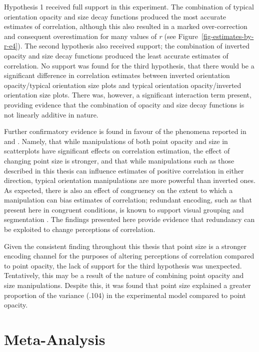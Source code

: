 \documentclass[../main.tex]{subfiles}
\begin{document}
Hypothesis 1 received full support in this experiment. The combination
of typical orientation opacity and size decay functions produced the
most accurate estimates of correlation, although this also resulted in a
marked over-correction and consequent overestimation for many values of
\emph{r} (see Figure~\ref{fig-estimates-by-r-e4}). The second hypothesis
also received support; the combination of inverted opacity and size
decay functions produced the least accurate estimates of correlation. No
support was found for the third hypothesis, that there would be a
significant difference in correlation estimates between inverted
orientation opacity/typical orientation size plots and typical
orientation opacity/inverted orientation size plots. There was, however,
a significant interaction term present, providing evidence that the
combination of opacity and size decay functions is not linearly additive
in nature.

Further confirmatory evidence is found in favour of the phenomena
reported in  and
. Namely, that while manipulations of both
point opacity and size in scatterplots have significant effects on
correlation estimation, the effect of changing point size is stronger,
and that while manipulations such as those described in this thesis can
influence estimates of positive correlation in either direction, typical
orientation manipulations are more powerful than inverted ones. As
expected, there is also an effect of congruency on the extent to which a
manipulation can bias estimates of correlation; redundant encoding, such
as that present here in congruent conditions, is known to support visual
grouping and segmentation \cite{nothelfer_2017}. The findings presented
here provide evidence that redundancy can be exploited to change
perceptions of correlation.

Given the consistent finding throughout this thesis that point size is a
stronger encoding channel for the purposes of altering perceptions of
correlation compared to point opacity, the lack of support for the third
hypothesis was unexpected. Tentatively, this may be a result of the
nature of combining point opacity and size manipulations. Despite this,
it was found that point size explained a greater proportion of the
variance (.104) in the experimental model compared to point opacity.

\section{Meta-Analysis}\label{meta-analysis}
\end{document}
